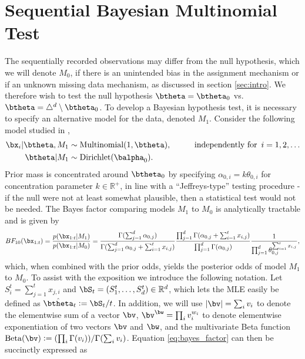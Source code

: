 \documentclass[11pt]{article}
\newcommand{\Reals}{\mathbb R}
\newcommand{\Beta}{\mathrm{Beta}}
\newcommand{\df}{\vcentcolon=}
\begin{document}
\section{Sequential Bayesian Multinomial Test}
\label{sec:srm_testing}
The sequentially recorded observations may differ from the null hypothesis, which we will denote $M_0$, if there is an unintended bias in the assignment mechanism or if an unknown missing data mechanism, as discussed in section \ref{sec:intro}.
We therefore wish to test the null hypothesis $\btheta = \btheta_0$ vs.\ $\btheta = \triangle^d \setminus \btheta_0$.
To develop a Bayesian hypothesis test, it is necessary to specify an alternative model for the data, denoted $M_1$.
Consider the following model studied in \cite{good},
\begin{align}
    \bx_i | \btheta, M_1 &\sim \text{Multinomial}(1,\btheta), \hspace{1cm} \text{independently for }\, i=1,2,\dots\\
  \btheta | M_1 &\sim \text{Dirichlet}(\balpha_0).\notag
\end{align}
Prior mass is concentrated around $\btheta_0$ by specifying $\alpha_{0,i} = k \theta_{0,i}$ for concentration parameter $k \in \mathbb{R}^+$, in line with a ``Jeffreys-type'' testing procedure - if the null were not at least somewhat plausible, then a statistical test would not be needed.
The Bayes factor comparing models $M_1$ to $M_0$ is analytically tractable and is given by
\begin{equation}
  \label{eq:bayes_factor}
 BF_{10}(\bx_{1:t}) = \frac{p(\bx_{1:t}|M_1)}{p(\bx_{1:t}|M_0)} = \frac{\Gamma(\sum_{j=1}^{d} \alpha_{0,j})}{\Gamma(\sum_{j=1}^{d} \alpha_{0,j} + \sum_{i=1}^{t}x_{i,j})}\frac{\prod_{j=1}^{d}\Gamma(\alpha_{0,j} + \sum_{i=1}^{t}x_{i,j} )}{\prod_{j=1}^{d}\Gamma(\alpha_{0,j} )}\frac{1}{\prod_{j=1}^{d} \theta_{0,j}^{\sum_{i=1}^{t}x_{i,j}}},
\end{equation}
which, when combined with the prior odds, yields the posterior odds of model $M_1$ to $M_0$.
To assist with the exposition we introduce the following notation. 
Let $S_i^t=\sum_{j=1}^{t}x_{j,i}$ and $\bS_t=(S_1^t,\ldots, S_d^t)\in\Reals^d$, 
which lets the MLE easily be defined as $\hat \btheta_t \df \bS_t/t$.
In addition, we will use $|\bv| = \sum_{i} v_i$ to denote the elementwise sum of a vector $\bv$, 
$\bv^{\bw} = \prod_{i} v_{i}^{w_i}$ to denote elementwise exponentiation of two vectors $\bv$ and $\bw$,
and the multivariate Beta function $\Beta(\bv) \df (\prod_{i}\Gamma(v_i))/\Gamma(\sum_i v_i)$. 
Equation \eqref{eq:bayes_factor} can then be succinctly expressed as 
\end{document}
